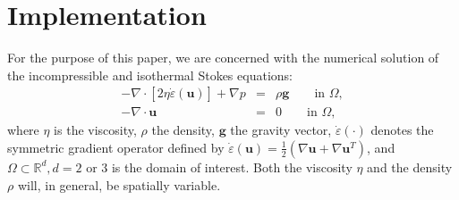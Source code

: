 \documentclass[a4paper]{article}
\begin{document}















\section{Implementation}


For the purpose of this paper, we are concerned with the numerical solution of 
the incompressible and isothermal Stokes equations:
\begin{eqnarray}
-\nabla \cdot \left[ 2\eta \dot\varepsilon({\bm u}) \right] + \nabla p &=& \rho \bm g \qquad  \textrm{in $\Omega$},
\label{eq:conv_momentum}  \\  
-\nabla \cdot {\bm u} &=& 0    \qquad    \textrm{in $\Omega$},   \label{eq:conv_mass} 
\end{eqnarray}
where $\eta$ is the viscosity, $\rho$ the density, ${\bm g}$ the gravity vector, $\dot\varepsilon(\cdot)$
denotes the symmetric gradient operator defined by $\dot\varepsilon({\bm u})
=\frac 12 (\nabla {\bm u} + \nabla {\bm u}^{T})$, 
and $\Omega\subset{\mathbb R}^d, d=2\text{ or }3$ is the domain
of interest. Both the viscosity $\eta$
and the density $\rho$ will, in general, be spatially variable.
\end{document}
